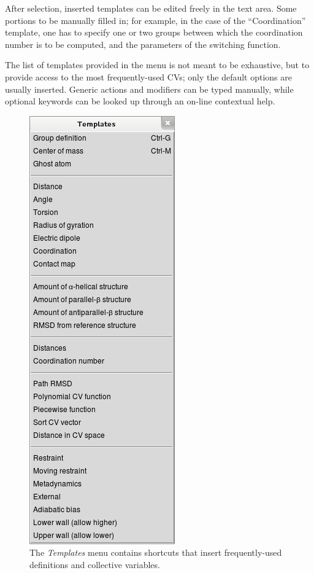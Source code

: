 \documentclass[preprint,12pt]{elsarticle}
\begin{document}
After selection, inserted templates can be edited freely in the text
area.  Some portions to be manually filled in; for example, in the
case of the ``Coordination'' template, one has to specify one or two
groups between which the coordination number is to be computed, and
the parameters of the switching function.

The list of templates provided in the menu is not meant to be
exhaustive, but to provide access to the most frequently-used CVs;
only the default options are usually inserted. Generic actions and
modifiers can be typed manually, while optional keywords can be looked
up through an on-line contextual help.

\begin{figure}
  \centering
  \includegraphics[scale=.5]{images/templates}
  \caption{The \emph{Templates} menu contains shortcuts that
    insert frequently-used definitions and collective variables.}
  \label{fig:templates}
\end{figure}
\end{document}
